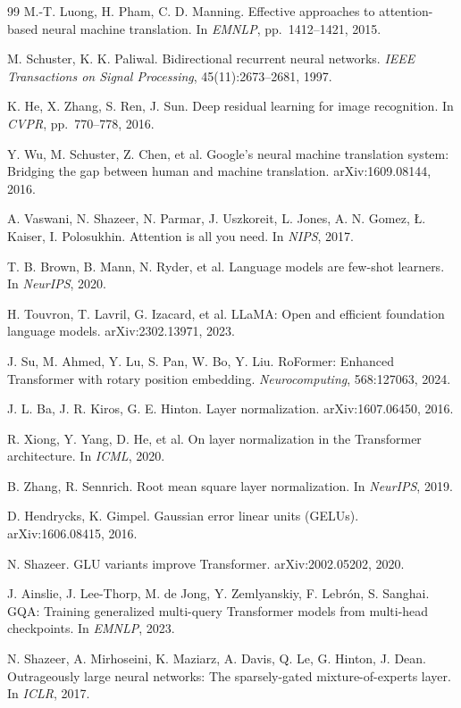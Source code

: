 \documentclass[11pt,a4paper]{article}
\begin{document}
\begin{thebibliography}{99}
 M.-T. Luong, H. Pham, C. D. Manning.
Effective approaches to attention-based neural machine translation.
In \emph{EMNLP}, pp.~1412--1421, 2015.

 M. Schuster, K. K. Paliwal.
Bidirectional recurrent neural networks.
\emph{IEEE Transactions on Signal Processing}, 45(11):2673--2681, 1997.

 K. He, X. Zhang, S. Ren, J. Sun.
Deep residual learning for image recognition.
In \emph{CVPR}, pp.~770--778, 2016.

 Y. Wu, M. Schuster, Z. Chen, et al.
Google's neural machine translation system: Bridging the gap between human and machine translation.
arXiv:1609.08144, 2016.

 A. Vaswani, N. Shazeer, N. Parmar, J. Uszkoreit, L. Jones, A. N. Gomez, {\L}. Kaiser, I. Polosukhin.
Attention is all you need.
In \emph{NIPS}, 2017.

 T. B. Brown, B. Mann, N. Ryder, et al.
Language models are few-shot learners.
In \emph{NeurIPS}, 2020.

 H. Touvron, T. Lavril, G. Izacard, et al.
LLaMA: Open and efficient foundation language models.
arXiv:2302.13971, 2023.

 J. Su, M. Ahmed, Y. Lu, S. Pan, W. Bo, Y. Liu.
RoFormer: Enhanced Transformer with rotary position embedding.
\emph{Neurocomputing}, 568:127063, 2024.

 J. L. Ba, J. R. Kiros, G. E. Hinton.
Layer normalization.
arXiv:1607.06450, 2016.

 R. Xiong, Y. Yang, D. He, et al.
On layer normalization in the Transformer architecture.
In \emph{ICML}, 2020.

 B. Zhang, R. Sennrich.
Root mean square layer normalization.
In \emph{NeurIPS}, 2019.

 D. Hendrycks, K. Gimpel.
Gaussian error linear units (GELUs).
arXiv:1606.08415, 2016.

 N. Shazeer.
GLU variants improve Transformer.
arXiv:2002.05202, 2020.

 J. Ainslie, J. Lee-Thorp, M. de Jong, Y. Zemlyanskiy, F. Lebr\'on, S. Sanghai.
GQA: Training generalized multi-query Transformer models from multi-head checkpoints.
In \emph{EMNLP}, 2023.

 N. Shazeer, A. Mirhoseini, K. Maziarz, A. Davis, Q. Le, G. Hinton, J. Dean.
Outrageously large neural networks: The sparsely-gated mixture-of-experts layer.
In \emph{ICLR}, 2017.


\end{thebibliography}
\end{document}
